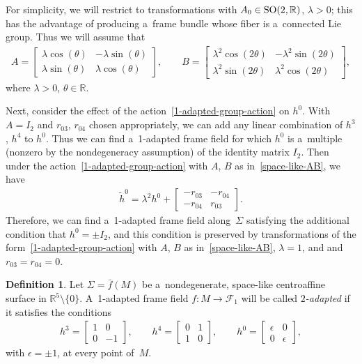 \documentclass[10pt,a4paper]{amsart}
\numberwithin{equation}{section}
\theoremstyle{definition}
\newtheorem{dfn}[teo]{Definition}
\begin{document}
For simplicity, we will restrict to transformations with $A_0 \in {\rm SO}(2,\mathbb{R})$, $\lambda > 0$; this has the
advantage of producing a~frame bundle whose f\/iber is a~connected Lie group.
Thus we will assume that
\begin{gather}
A=
\begin{bmatrix}
\lambda \cos (\theta) & -\lambda \sin (\theta)
\\
\lambda \sin (\theta) & \lambda \cos (\theta)
\end{bmatrix},
\qquad
B =
\begin{bmatrix}
\lambda^2 \cos (2\theta) & -\lambda^2 \sin (2\theta)
\\
\lambda^2 \sin (2\theta) & \lambda^2 \cos (2\theta)
\end{bmatrix},
\label{space-like-AB}
\end{gather}
where $\lambda > 0$, $\theta \in \mathbb{R}$.

Next, consider the ef\/fect of the action~\eqref{1-adapted-group-action} on $h^0$.
With $A = I_2$ and $r_{03}$, $r_{04}$ chosen appropriately, we can add any linear combination of $h^3$, $h^4$ to $h^0$.
Thus we can f\/ind a~1-adapted frame f\/ield for which $h^0$ is a~multiple (nonzero by the nondegeneracy assumption) of the
identity matrix $I_2$.
Then under the action~\eqref{1-adapted-group-action} with $A$, $B$ as in~\eqref{space-like-AB}, we have
\begin{gather*}
\tilde{h}^0 = \lambda^2 h^0 +
\begin{bmatrix}
-r_{03} & -r_{04}
\\
-r_{04} & r_{03}
\end{bmatrix}.
\end{gather*}
Therefore, we can f\/ind a~1-adapted frame f\/ield along~$\Sigma$ satisfying the additional condition that $h^0 = \pm I_2$,
and this condition is preserved by transformations of the form~\eqref{1-adapted-group-action} with $A$, $B$ as
in~\eqref{space-like-AB}, $\lambda=1$, and and $r_{03} = r_{04} = 0$.

\begin{dfn}
Let $\Sigma = \bar{f}(M)$ be a~nondegenerate, space-like centroaf\/f\/ine surface in $\mathbb{R}^5 \setminus \{0\}$.
A~1-adapted frame f\/ield $f:M \to \mathcal{F}_1$ will be called {\em $2$-adapted} if it satisf\/ies the conditions
\begin{gather}
h^3 =
\begin{bmatrix}
1 & 0
\\
0 & -1
\end{bmatrix},
\qquad
h^4 =
\begin{bmatrix}
0 & 1
\\
1 & 0
\end{bmatrix},
\qquad
h^0 =
\begin{bmatrix}
\epsilon & 0
\\
0 & \epsilon
\end{bmatrix},
\label{2-adapted-space-like-h}
\end{gather}
with $\epsilon=\pm 1$, at every point of~$M$.
\end{dfn}
\end{document}
